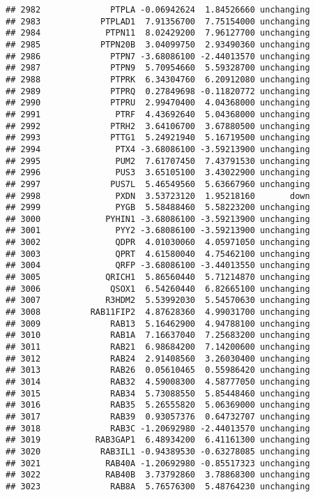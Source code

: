 \documentclass[]{article}
\begin{document}
\begin{verbatim}
## 2982              PTPLA -0.06942624  1.84526660 unchanging
## 2983            PTPLAD1  7.91356700  7.75154000 unchanging
## 2984             PTPN11  8.02429200  7.96127700 unchanging
## 2985            PTPN20B  3.04099750  2.93490360 unchanging
## 2986              PTPN7 -3.68086100 -2.44013570 unchanging
## 2987              PTPN9  5.70954660  5.59328700 unchanging
## 2988              PTPRK  6.34304760  6.20912080 unchanging
## 2989              PTPRQ  0.27849698 -0.11820772 unchanging
## 2990              PTPRU  2.99470400  4.04368000 unchanging
## 2991               PTRF  4.43692640  5.04368000 unchanging
## 2992              PTRH2  3.64106700  3.67880500 unchanging
## 2993              PTTG1  5.24921940  5.16719500 unchanging
## 2994               PTX4 -3.68086100 -3.59213900 unchanging
## 2995               PUM2  7.61707450  7.43791530 unchanging
## 2996               PUS3  3.65105100  3.43022900 unchanging
## 2997              PUS7L  5.46549560  5.63667960 unchanging
## 2998               PXDN  3.53723120  1.95218160       down
## 2999               PYGB  5.58488460  5.58223200 unchanging
## 3000             PYHIN1 -3.68086100 -3.59213900 unchanging
## 3001               PYY2 -3.68086100 -3.59213900 unchanging
## 3002               QDPR  4.01030060  4.05971050 unchanging
## 3003               QPRT  4.61580040  4.75462100 unchanging
## 3004               QRFP -3.68086100 -3.44013550 unchanging
## 3005             QRICH1  5.86560440  5.71214870 unchanging
## 3006              QSOX1  6.54260440  6.82665100 unchanging
## 3007             R3HDM2  5.53992030  5.54570630 unchanging
## 3008          RAB11FIP2  4.87628360  4.99031700 unchanging
## 3009              RAB13  5.16462900  4.94788100 unchanging
## 3010              RAB1A  7.16637040  7.25683200 unchanging
## 3011              RAB21  6.98684200  7.14200600 unchanging
## 3012              RAB24  2.91408560  3.26030400 unchanging
## 3013              RAB26  0.05610465  0.55986420 unchanging
## 3014              RAB32  4.59008300  4.58777050 unchanging
## 3015              RAB34  5.73088550  5.85448460 unchanging
## 3016              RAB35  5.26555820  5.06369000 unchanging
## 3017              RAB39  0.93057376  0.64732707 unchanging
## 3018              RAB3C -1.20692980 -2.44013570 unchanging
## 3019           RAB3GAP1  6.48934200  6.41161300 unchanging
## 3020            RAB3IL1 -0.94389530 -0.63278085 unchanging
## 3021             RAB40A -1.20692980 -0.85517323 unchanging
## 3022             RAB40B  3.73792860  3.78868300 unchanging
## 3023              RAB8A  5.76576300  5.48764230 unchanging

\end{verbatim}
\end{document}
